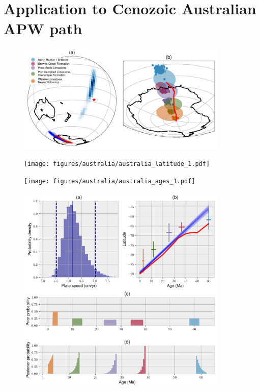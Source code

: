 \documentclass[preprint,12pt,authoryear]{elsarticle}
\begin{document}
\section{Application to Cenozoic Australian APW path}
\label{sec:australia}
\clearpage
\begin{figure}
\includegraphics[width=0.9\textwidth]{figures/australia/australia_paths_1.pdf}
\caption{}
\label{fig:australia_paths_1}
\end{figure}
\begin{figure}
\texttt{[image: figures/australia/australia\_latitude\_1.pdf]}
\caption{}
\label{fig:australia_latitude_1}
\end{figure}
\begin{figure}
\texttt{[image: figures/australia/australia\_ages\_1.pdf]}
\caption{}
\label{fig:australia_ages_1}
\end{figure}
\begin{figure}
\includegraphics[width=0.9\textwidth]{figures/australia/australia_speeds_1.pdf}
\caption{}
\label{fig:australia_speeds_1}
\end{figure}
\end{document}

